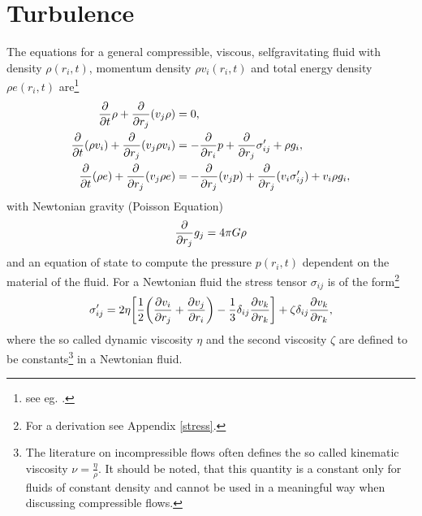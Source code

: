 \chapter{Turbulence}\label{turbulence}
The equations for a general compressible, viscous, selfgravitating fluid 
with density $\rho(r_i,t)$, momentum density $\rho v_i(r_i,t)$ and total
energy density $\rho e(r_i,t)$ are\footnote{see eg. \citet{Landau1991}.}
\begin{align}
\pd{t}\rho + \pd{r_j}(v_j \rho) &= 0, \label{eq:mass}\\
\pd{t}(\rho v_i) + \pd{r_j}(v_j \rho v_i) &= -\pd{r_i}p + \pd{r_j}\sigma'_{ij}
+\rho g_i, 
\label{eq:mom} \\
\pd{t}(\rho e) + \pd{r_j}(v_j \rho e) &= -\pd{r_j}(v_j p) + \pd{r_j}(v_i
\sigma'_{ij}) + v_i \rho g_i,
\label{eq:etot}
\end{align}
with Newtonian gravity (Poisson Equation)
\begin{align}
\pd{r_j}g_j=4\pi G \rho
\end{align}
and an equation of state to compute the pressure $p(r_i,t)$ dependent on
the material of the fluid. For a Newtonian fluid the stress tensor
$\sigma_{ij}$ is of the form\footnote{For a derivation see Appendix
\ref{stress}.}
\begin{align}
\sigma'_{ij} =  
2\eta\lrb{\frac{1}{2}\lra{\ppd{r_j}{v_i}+\ppd{r_i}{v_j}}
-\frac{1}{3}\delta_{ij}\ppd{r_k}{v_k}}
+\zeta \delta_{ij}\ppd{r_k}{v_k},
\end{align}
where the so called dynamic viscosity $\eta$ and the second viscosity $\zeta$
are defined to be constants\footnote{The literature on incompressible flows
often defines the so called kinematic viscosity $\nu=\frac{\eta}{\rho}$. It
should be noted, that this quantity is a constant only for fluids of constant
density and cannot be used in a meaningful way when discussing compressible
flows.} in a Newtonian fluid.

